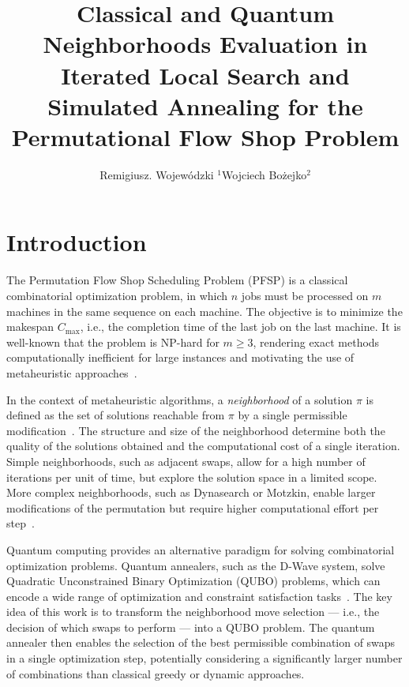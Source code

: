 \documentclass[10pt,twoside,twocolumn,a4paper]{article}
\title{Classical and Quantum Neighborhoods Evaluation in Iterated Local Search and Simulated Annealing for the Permutational Flow Shop Problem}
\author{Remigiusz. Wojewódzki \email{remigiusz.wojewodzki@gmail.com} $^{1}$Wojciech Bożejko$^{2}$\email{wojciech.bozejko@pwr.edu.pl}}
\begin{document}
\maketitle


\section{Introduction}

The Permutation Flow Shop Scheduling Problem (PFSP) is a classical combinatorial optimization problem, in which $n$ jobs must be processed on $m$ machines in the same sequence on each machine. The objective is to minimize the makespan $C_{\max}$, i.e., the completion time of the last job on the last machine. It is well-known that the problem is NP-hard for $m \ge 3$, rendering exact methods computationally inefficient for large instances and motivating the use of metaheuristic approaches~\cite{ref_bozejko_parallel}.

In the context of metaheuristic algorithms, a \emph{neighborhood} of a solution $\pi$ is defined as the set of solutions reachable from $\pi$ by a single permissible modification~\cite{vanlaarhoven1992}. The structure and size of the neighborhood determine both the quality of the solutions obtained and the computational cost of a single iteration. Simple neighborhoods, such as adjacent swaps, allow for a high number of iterations per unit of time, but explore the solution space in a limited scope. More complex neighborhoods, such as Dynasearch or Motzkin, enable larger modifications of the permutation but require higher computational effort per step~\cite{WojewodzkiBozejko2026,Motzkin_PWR}.

Quantum computing provides an alternative paradigm for solving combinatorial optimization problems. Quantum annealers, such as the D-Wave system, solve Quadratic Unconstrained Binary Optimization (QUBO) problems, which can encode a wide range of optimization and constraint satisfaction tasks~\cite{dwave_handbook}. The key idea of this work is to transform the neighborhood move selection — i.e., the decision of which swaps to perform — into a QUBO problem. The quantum annealer then enables the selection of the best permissible combination of swaps in a single optimization step, potentially considering a significantly larger number of combinations than classical greedy or dynamic approaches.
\end{document}
